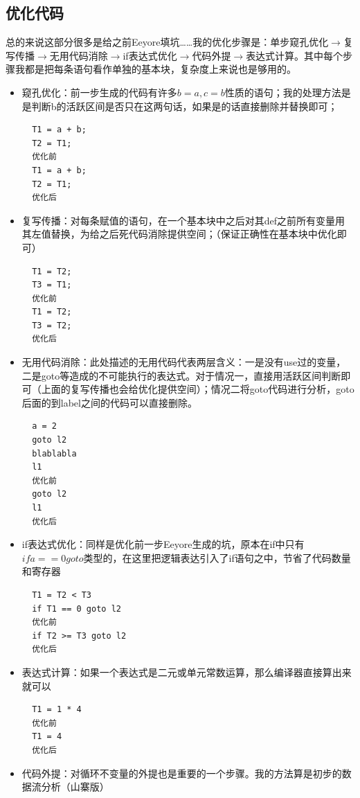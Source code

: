 \documentclass{ctexart}
\begin{document}
\subsection{优化代码}

总的来说这部分很多是给之前Eeyore填坑……我的优化步骤是：单步窥孔优化$\rightarrow$复写传播$\rightarrow$无用代码消除$\rightarrow$if表达式优化$\rightarrow$代码外提$\rightarrow$表达式计算。其中每个步骤我都是把每条语句看作单独的基本块，复杂度上来说也是够用的。

\begin{itemize}
  \item 窥孔优化：前一步生成的代码有许多$b = a, c = b$性质的语句；我的处理方法是是判断b的活跃区间是否只在这两句话，如果是的话直接删除并替换即可；
  \begin{lstlisting}
  T1 = a + b;
  T2 = T1;
  优化前
  T1 = a + b;
  T2 = T1;
  优化后
  \end{lstlisting}
  \item 复写传播：对每条赋值的语句，在一个基本块中之后对其def之前所有变量用其左值替换，为给之后死代码消除提供空间；（保证正确性在基本块中优化即可）
  \begin{lstlisting}
  T1 = T2;
  T3 = T1;
  优化前
  T1 = T2;
  T3 = T2;
  优化后
  \end{lstlisting}
  \item 无用代码消除：此处描述的无用代码代表两层含义：一是没有use过的变量，二是goto等造成的不可能执行的表达式。对于情况一，直接用活跃区间判断即可（上面的复写传播也会给优化提供空间）；情况二将goto代码进行分析，goto后面的到label之间的代码可以直接删除。
  \begin{lstlisting}
  a = 2
  goto l2
  blablabla
  l1
  优化前
  goto l2
  l1
  优化后
  \end{lstlisting}
  \item if表达式优化：同样是优化前一步Eeyore生成的坑，原本在if中只有$if a == 0 goto$类型的，在这里把逻辑表达引入了if语句之中，节省了代码数量和寄存器
  \begin{lstlisting}
  T1 = T2 < T3
  if T1 == 0 goto l2
  优化前
  if T2 >= T3 goto l2
  优化后
  \end{lstlisting}
  \item 表达式计算：如果一个表达式是二元或单元常数运算，那么编译器直接算出来就可以
  \begin{lstlisting}
  T1 = 1 * 4
  优化前
  T1 = 4
  优化后
  \end{lstlisting}
  \item 代码外提：对循环不变量的外提也是重要的一个步骤。我的方法算是初步的数据流分析（山寨版）

\end{itemize}
\end{document}
